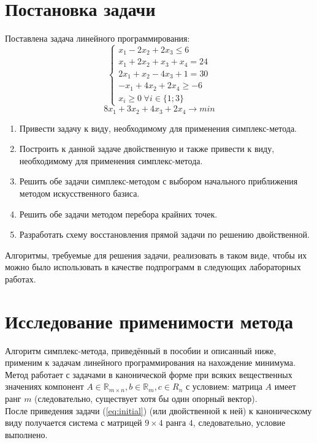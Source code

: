 \documentclass[main.tex]{subfiles}
\begin{document}
\section{Постановка задачи}
Поставлена задача линейного программирования:
\begin{equation}\label{eq:initial}
\left\{
\begin{array}{ll} 
x_1-2x_2+2x_3 \le 6\\
x_1+2x_2+x_3+x_4=24\\
2x_1+x_2-4x_3+1=30\\
-x_1+4x_2+2x_4 \ge -6\\
x_i \ge 0 \hspace{3pt} \forall i \in \{1;3\}
\end{array}
\right.
\end{equation}
$$ 8x_1 + 3x_2 + 4x_3 + 2x_4 \longrightarrow min $$
\begin{enumerate}
\item Привести задачу к виду, необходимому для применения симплекс-метода.
\item Построить к данной задаче двойственную и также привести к виду, необходимому для применения симплекс-метода.
\item Решить обе задачи симплекс-методом с выбором начального приближения методом искусственного базиса.
\item Решить обе задачи методом перебора крайних точек.
\item Разработать схему восстановления прямой задачи по решению двойственной.
\end{enumerate}
Алгоритмы, требуемые для решения задачи, реализовать в таком виде, чтобы их можно было использовать в качестве подпрограмм в следующих лабораторных работах.
\section{Исследование применимости метода}
Алгоритм симплекс-метода, приведённый в пособии \cite{petuh} и описанный ниже, применим к задачам линейного программирования на нахождение минимума. Метод работает с задачами в канонической форме при всяких вещественных значениях компонент $A \in \mathds{R}_{m\times n}, b \in \mathds{R}_m, c \in R_n$ с условием: матрица $A$ имеет ранг $m$ (следовательно, существует хотя бы один опорный вектор).\\
После приведения задачи (\ref{eq:initial}) (или двойственной к ней) к каноническому виду получается система с матрицей $ 9 \times 4 $ ранга $4$, следовательно, условие выполнено.\\
\end{document}
